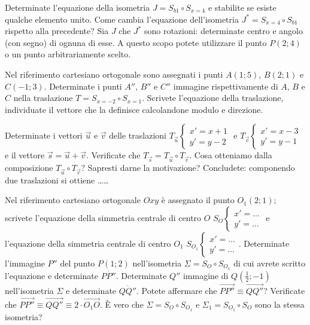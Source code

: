 \begin{esercizio}
	\label{ese:8.73} %
	Determinate l'equazione della isometria $J=S_{b1} \circ S_{x=4}$ e 
	stabilite se esiste qualche elemento unito. Come cambia l'equazione 
	dell'isometria $J^*=S_{x=4} \circ S_{b1}$ rispetto alla precedente? 
	Sia $J$ che $J^*$ sono rotazioni: determinate centro e angolo (con 
	segno) di ognuna di esse. A questo scopo potete utilizzare il punto 
	$P(2;4)$ o un punto arbitrariamente scelto.
\end{esercizio}

\begin{esercizio}
	\label{ese:8.76} %
	Nel riferimento cartesiano ortogonale sono assegnati i punti 
	$A(1;5)$, $B(2;1)$ e $C(-1;3)$. Determinate i punti $A''$, $B''$ e 
	$C''$ immagine rispettivamente di $A$, $B$ e $C$ nella traslazione 
	$T=S_{x=-2} \circ S_{x=1}$. Scrivete l'equazione della traslazione, 
	individuate il vettore che la definisce calcolandone modulo e 
	direzione.
\end{esercizio}

\begin{esercizio}
	\label{ese:8.77} %
	Determinate i vettori $\vec{u}$ e $\vec{v}$ delle traslazioni 
	$T_{\vec{u}}\begin{cases}x'=x+1\\y'=y-2\end{cases}$ e 
	$T_{\vec{v}}\begin{cases}x'=x-3\\y'=y-1\end{cases}$ e il vettore 
	$\vec{s} = \vec{u} + \vec{v}$. Verificate che $T_{\vec{s}} = 
	T_{\vec{u}} \circ T_{\vec{v}}$.
	Cosa otteniamo dalla composizione $T_{\vec{u}} \circ T_{\vec{v}}$? 
	Sapresti darne la motivazione?
	Concludete: componendo due traslazioni si ottiene \ldots\ldots{}
\end{esercizio}

\begin{esercizio}
	\label{ese:8.78} %
	Nel riferimento cartesiano ortogonale $Oxy$ è assegnato il punto 
	$O_1(2;1)$; scrivete l'equazione della simmetria centrale di centro 
	$O$ $S_O\begin{cases}x'=\ldots{}\\y'=\ldots{}\end{cases}$  e 
	l'equazione della simmetria centrale di centro $O_1$ 
	$S_{O_1}\begin{cases}x'=\ldots{}\\y'=\ldots{}\end{cases}$. 
	Determinate l'immagine $P''$ del punto $P(1;2)$ nell'isometria 
	$\Sigma=S_O \circ S_{O_1}$ di cui avrete scritto l'equazione e 
	determinate $\overline{PP''}$. Determinate $Q''$ immagine di 
	$Q\left(\frac{1}{2};-1\right)$ nell'isometria $\Sigma$ e determinate 
	$\overline{QQ''}$. Potete affermare che $\overrightarrow{PP''} \equiv 
	\overrightarrow{QQ''}$? Verificate che $\overrightarrow{PP''} \equiv 
	\overrightarrow{QQ''} \equiv 2\cdot \overrightarrow{O_1O}$.
	\`E vero che $\Sigma=S_O \circ S_{O_1}$ e $\Sigma_1=S_{O_1} \circ 
	S_{O}$ sono la stessa isometria?
\end{esercizio}

